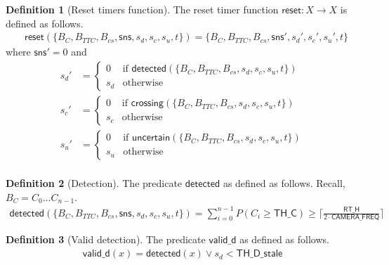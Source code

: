 \documentclass[12pt]{article}
\theoremstyle{definition}
\newtheorem{definition}{Definition}[section]
\begin{document}
\begin{definition}[Reset timers function]
The reset timer function $\mathsf{reset}: X \to X$ is defined as follows.
    \[
    \begin{aligned}
        &\mathsf{reset}(\{B_C, B_{TTC}, B_{cs}, \mathsf{sns}, s_d, s_c, s_u, t\}) = \{B_C, B_{TTC}, B_{cs},  \mathsf{sns}', s_d', s_c', s_u',t\}
    \end{aligned}
\]
where $\mathsf{sns}' = 0$ and 
\[
    \begin{aligned}
    s_d' &=     
    \begin{cases}
        0 & \text{if } \mathsf{detected}(\{B_C, B_{TTC}, B_{cs}, s_d, s_c, s_u, t\}) \\
        s_d & \text{otherwise}
    \end{cases}\\
    s_c' &=     
    \begin{cases}
        0 & \text{if } \mathsf{crossing}(\{B_C, B_{TTC}, B_{cs}, s_d, s_c, s_u, t\}) \\
        s_c & \text{otherwise}
    \end{cases}\\
    s_u' &=     
    \begin{cases}
        0 & \text{if } \mathsf{uncertain}(\{B_C, B_{TTC}, B_{cs}, s_d, s_c, s_u, t\}) \\
        s_u & \text{otherwise}
    \end{cases}\\
    \end{aligned}
\]
\end{definition}

\begin{definition}[Detection]
    The predicate $\mathsf{detected}$ as defined as follows. Recall, $B_C = C_0 \ldots C_{n-1}$.
    \[
        \begin{aligned}
                \mathsf{detected}(\{B_C, B_{TTC}, B_{cs}, \mathsf{sns}, s_d, s_c, s_u, t\}) = \sum_{i=0}^{n-1} P(C_i \geq \mathsf{TH\_C}) \geq \lceil \frac{\mathsf{RT\_H}}{ 2 \cdot \mathsf{CAMERA\_FREQ}} \rceil
        \end{aligned}
    \]
\end{definition}

\begin{definition}[Valid detection]
    The predicate $\mathsf{valid\_d}$ as defined as follows.
    \[
        \begin{aligned}
                \mathsf{valid\_d}(x) = \mathsf{detected}(x) \lor s_d < \mathsf{TH\_D\_stale}
        \end{aligned}
    \]
\end{definition}
\end{document}
